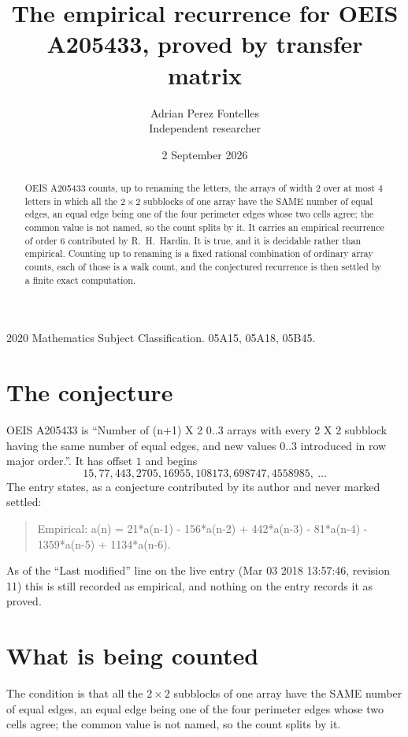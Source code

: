 \documentclass[11pt,a4paper]{article}
\title{The empirical recurrence for OEIS A205433, proved by transfer matrix}
\author{Adrian Perez Fontelles\\ \small Independent researcher}
\date{2 September 2026}
\theoremstyle{plain}
\theoremstyle{definition}
\begin{document}
\maketitle

\begin{abstract}
OEIS A205433 counts, up to renaming the letters, the arrays of width $2$ over at most $4$
letters in which all the $2\times2$ subblocks of one array have the SAME number of equal edges, an equal edge being one of the four perimeter edges whose two cells agree; the common value is not named, so the count splits by it. It carries an empirical recurrence of order $6$ contributed by
R.~H.~Hardin. It is true, and it is decidable rather than empirical. Counting up to renaming is
a fixed rational combination of ordinary array counts, each of those is a walk count, and the
conjectured recurrence is then settled by a finite exact computation.
\end{abstract}

\noindent\small 2020 Mathematics Subject Classification. 05A15, 05A18, 05B45.\normalsize

\section{The conjecture}

OEIS A205433 is ``Number of (n+1) X 2 0..3 arrays with every 2 X 2 subblock having the same number of equal edges, and new values 0..3 introduced in row major order.''. It has offset $1$ and begins
\[
15, 77, 443, 2705, 16955, 108173, 698747, 4558985,\ \dots
\]
The entry states, as a conjecture contributed by its author and never marked settled:
\begin{quote}
Empirical: a(n) = 21*a(n-1) - 156*a(n-2) + 442*a(n-3) - 81*a(n-4) - 1359*a(n-5) + 1134*a(n-6).
\end{quote}
As of the ``Last modified'' line on the live entry (Mar 03 2018 13:57:46, revision 11) this is still
recorded as empirical, and nothing on the entry records it as proved.

\section{What is being counted}

The condition is that all the $2\times2$ subblocks of one array have the SAME number of equal edges, an equal edge being one of the four perimeter edges whose two cells agree; the common value is not named, so the count splits by it.
\end{document}
